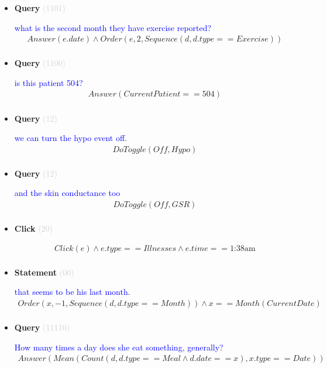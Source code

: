 \documentclass[11pt]{article}
\newcommand{\key}[1]{\textcolor{lightgray}{#1}}
\newcounter{CQuery}
\newcounter{CStatement}
\newcounter{CClick}
\begin{document}
\begin{itemize}
\item
\textbf{Query\theCQuery} \key{(1101)} \addtocounter{CQuery}{1}
\textcolor{blue}{ what is the second month they have exercise reported? }
\begin{multline*}
Answer(e.date) \wedge Order(e, 2, Sequence(d, d.type==Exercise)) \\ 
\end{multline*}


\item
\textbf{Query\theCQuery} \key{(1100)} \addtocounter{CQuery}{1}
\textcolor{blue}{ is this patient 504? }
\begin{multline*}
Answer(CurrentPatient==504) \\ 
\end{multline*}


\item
\textbf{Query\theCQuery} \key{(12)} \addtocounter{CQuery}{1}
\textcolor{blue}{ we can turn the hypo event off. }
\begin{multline*}
DoToggle(Off, Hypo) \\ 
\end{multline*}


\item
\textbf{Query\theCQuery} \key{(12)} \addtocounter{CQuery}{1}
\textcolor{blue}{ and the skin conductance too }
\begin{multline*}
DoToggle(Off, GSR) \\ 
\end{multline*}


\item
\textbf{Click\theCClick} \key{(20)} \addtocounter{CClick}{1}
\textcolor{blue}{  }
\begin{multline*}
Click(e) \wedge e.type==Illnesses \wedge e.time==\mbox{1:38am} \\ 
\end{multline*}


\item
\textbf{Statement\theCStatement} \key{(00)} \addtocounter{CStatement}{1}
\textcolor{blue}{ that seems to be his last month. }
\begin{multline*}
Order(x, -1, Sequence(d, d.type==Month)) \wedge x==Month(CurrentDate) \\ 
\end{multline*}


\item
\textbf{Query\theCQuery} \key{(11110)} \addtocounter{CQuery}{1}
\textcolor{blue}{ How many times a day does she eat something, generally? }
\begin{multline*}
Answer(Mean(Count(d, d.type==Meal \wedge d.date==x), x.type==Date)) \\ 
\end{multline*}



\end{itemize}
\end{document}
